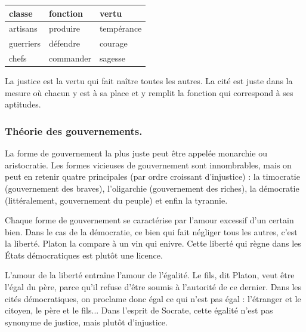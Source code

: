 \documentclass[fontsize=28pt,a4paper]{scrartcl}
\begin{document}
\begin{longtable}[]{@{}lll@{}}
\toprule()
classe & fonction & vertu \\
\midrule()
\endhead artisans & produire & tempérance \\
guerriers & défendre & courage \\
chefs & commander & sagesse \\
\bottomrule()
\end{longtable}

La justice est la vertu qui fait naître toutes les autres. La cité est juste dans la mesure où chacun y est à sa place et y remplit la fonction qui correspond à ses aptitudes.

\subsubsection*{Théorie des gouvernements.}

La forme de gouvernement la plus juste peut être appelée monarchie ou aristocratie. Les formes vicieuses de gouvernement sont innombrables, mais on peut en retenir quatre principales (par ordre croissant d'injustice) : la timocratie (gouvernement des braves), l'oligarchie (gouvernement des riches), la démocratie (littéralement, gouvernement du peuple) et enfin la tyrannie.

Chaque forme de gouvernement se caractérise par l'amour excessif d'un certain bien. Dans le cas de la démocratie, ce bien qui fait négliger tous les autres, c'est la liberté. Platon la compare à un vin qui enivre. Cette liberté qui règne dans les États démocratiques est plutôt une licence.

L'amour de la liberté entraîne l'amour de l'égalité. Le fils, dit Platon, veut être l'égal du père, parce qu'il refuse d'être soumis à l'autorité de ce dernier. Dans les cités démocratiques, on proclame donc égal ce qui n'est pas égal : l'étranger et le citoyen, le père et le fils... Dans l'esprit de Socrate, cette égalité n'est pas synonyme de justice, mais plutôt d'injustice.

\end{document}
